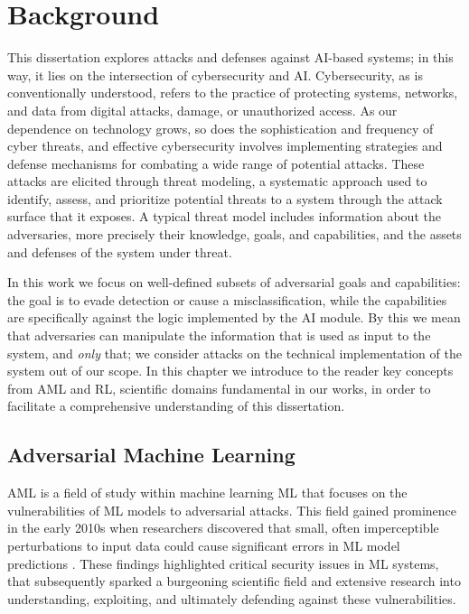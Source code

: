 \chapter{Background}\label{ch:background}

This dissertation explores attacks and defenses against AI-based systems; in this way, it lies on the intersection of cybersecurity and AI.
Cybersecurity, as is conventionally understood, refers to the practice of protecting systems, networks, and data from digital attacks, damage, or unauthorized access.
As our dependence on technology grows, so does the sophistication and frequency of cyber threats, and effective cybersecurity involves implementing strategies and defense mechanisms for combating a wide range of potential attacks.
These attacks are elicited through threat modeling, a systematic approach used to identify, assess, and prioritize potential threats to a system through the attack surface that it exposes.
A typical threat model includes information about the adversaries, more precisely their knowledge, goals, and capabilities, and the assets and defenses of the system under threat.

In this work we focus on well-defined subsets of adversarial goals and capabilities: the goal is to evade detection or cause a misclassification, while the capabilities are specifically against the logic implemented by the AI module.
By this we mean that adversaries can manipulate the information that is used as input to the system, and \textit{only} that; we consider attacks on the technical implementation of the system out of our scope.
In this chapter we introduce to the reader key concepts from \gls{AML} and \gls{RL}, scientific domains fundamental in our works, in order to facilitate a comprehensive understanding of this dissertation.

\section{Adversarial Machine Learning}
\gls{AML} is a field of study within machine learning \gls{ML} that focuses on the vulnerabilities of \gls{ML} models to adversarial attacks.
This field gained prominence in the early 2010s when researchers discovered that small, often imperceptible perturbations to input data could cause significant errors in ML model predictions \cite{biggio2013evasion, szegedy2013intriguing}.
These findings highlighted critical security issues in ML systems, that subsequently sparked a burgeoning scientific field and extensive research into understanding, exploiting, and ultimately defending against these vulnerabilities.

